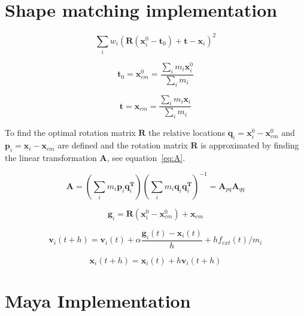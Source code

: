\section{Shape matching implementation}

   
    \begin{equation} \label{eq:min}
        \sum_i{w_i(\mathbf{R}(\mathbf{x}_i^0 - \mathbf{t}_0) + \mathbf{t} - \mathbf{x}_i)^2}
    \end{equation}

    \begin{equation} \label{eq:com1}
        \mathbf{t}_0 = \mathbf{x}^0_{cm} = \frac{\sum_i{m_i\mathbf{x}_i^0}}{\sum_i{m_i}}
    \end{equation}

    \begin{equation} \label{eq:com2}
        \mathbf{t} = \mathbf{x}_{cm} = \frac{\sum_i{m_i\mathbf{x}_i}}{\sum_i{m_i}}
    \end{equation}

    To find the optimal rotation matrix $\mathbf{R}$ the relative locations 
    $\mathbf{q}_i = \mathbf{x}^0_i - \mathbf{x}^0_{cm}$ and 
    $\mathbf{p}_i = \mathbf{x}_i - \mathbf{x}_{cm}$ are defined and the rotation matrix 
    $\mathbf{R}$ is approximated by finding the linear transformation $\mathbf{A}$, see equation~\ref{eq:A}.

    \begin{equation} \label{eq:A}
        \mathbf{A} = (\sum_i{m_i\mathbf{p}_i\mathbf{q}_i^{\mathbf{T}}})
        (\sum_i{m_i\mathbf{q}_i\mathbf{q}_i^{\mathbf{T}}})^{-1} 
        = \mathbf{A}_{pq}\mathbf{A}_{qq}
    \end{equation}

    \begin{equation}\label{eq:goal}
        \mathbf{g}_i = \mathbf{R}(\mathbf{x}^0_i - \mathbf{x}^0_{cm}) + \mathbf{x}_{cm}
    \end{equation}

    \begin{equation} \label{eq:vel}
        \mathbf{v}_i(t + h) = \mathbf{v}_i(t) + \alpha{\frac{\mathbf{g}_i(t) - \mathbf{x}_i(t)}{h}} + hf_{ext}(t)/m_i
    \end{equation}

    \begin{equation} \label{eq:pos}
        \mathbf{x}_i(t + h) = \mathbf{x}_i(t) + h\mathbf{v}_i(t + h) 
    \end{equation}


\section{Maya Implementation}

